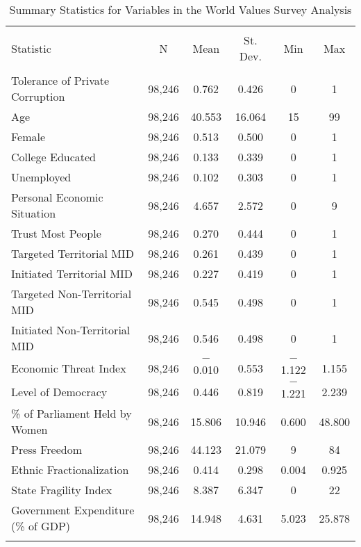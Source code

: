 \documentclass[11pt,]{article}
\begin{document}
\begin{table}[!htbp] \centering 
  \caption{Summary Statistics for Variables in the World Values Survey Analysis} 
  \label{tab:summarywvs} 
\begin{tabular}{@{\extracolsep{5pt}}lccccc} 
\\[-1.8ex]\hline 
\hline \\[-1.8ex] 
Statistic & \multicolumn{1}{c}{N} & \multicolumn{1}{c}{Mean} & \multicolumn{1}{c}{St. Dev.} & \multicolumn{1}{c}{Min} & \multicolumn{1}{c}{Max} \\ 
\hline \\[-1.8ex] 
Tolerance of Private Corruption & 98,246 & 0.762 & 0.426 & 0 & 1 \\ 
Age & 98,246 & 40.553 & 16.064 & 15 & 99 \\ 
Female & 98,246 & 0.513 & 0.500 & 0 & 1 \\ 
College Educated & 98,246 & 0.133 & 0.339 & 0 & 1 \\ 
Unemployed & 98,246 & 0.102 & 0.303 & 0 & 1 \\ 
Personal Economic Situation & 98,246 & 4.657 & 2.572 & 0 & 9 \\ 
Trust Most People & 98,246 & 0.270 & 0.444 & 0 & 1 \\ 
Targeted Territorial MID & 98,246 & 0.261 & 0.439 & 0 & 1 \\ 
Initiated Territorial MID & 98,246 & 0.227 & 0.419 & 0 & 1 \\ 
Targeted Non-Territorial MID & 98,246 & 0.545 & 0.498 & 0 & 1 \\ 
Initiated Non-Territorial MID & 98,246 & 0.546 & 0.498 & 0 & 1 \\ 
Economic Threat Index & 98,246 & $-$0.010 & 0.553 & $-$1.122 & 1.155 \\ 
Level of Democracy & 98,246 & 0.446 & 0.819 & $-$1.221 & 2.239 \\ 
\% of Parliament Held by Women & 98,246 & 15.806 & 10.946 & 0.600 & 48.800 \\ 
Press Freedom & 98,246 & 44.123 & 21.079 & 9 & 84 \\ 
Ethnic Fractionalization & 98,246 & 0.414 & 0.298 & 0.004 & 0.925 \\ 
State Fragility Index & 98,246 & 8.387 & 6.347 & 0 & 22 \\ 
Government Expenditure (\% of GDP) & 98,246 & 14.948 & 4.631 & 5.023 & 25.878 \\ 
\hline \\[-1.8ex] 
\end{tabular} 
\end{table}




\newpage
\singlespacing 
\end{document}
